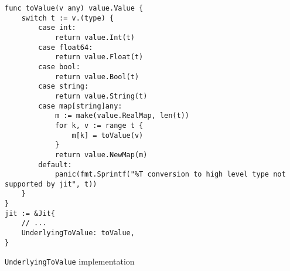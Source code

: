 \begin{listing}[H]
    \begin{verbatim}
func toValue(v any) value.Value {
    switch t := v.(type) {
        case int:
            return value.Int(t)
        case float64:
            return value.Float(t)
        case bool:
            return value.Bool(t)
        case string:
            return value.String(t)
        case map[string]any:
            m := make(value.RealMap, len(t))
            for k, v := range t {
                m[k] = toValue(v)
            }
            return value.NewMap(m)
        default:
            panic(fmt.Sprintf("%T conversion to high level type not supported by jit", t))
    }
}
jit := &Jit{
    // ...
    UnderlyingToValue: toValue,
}
    \end{verbatim}
    \caption{\texttt{UnderlyingToValue} implementation}
    \label{code:type-clashes-impl-tovalue}
\end{listing}
